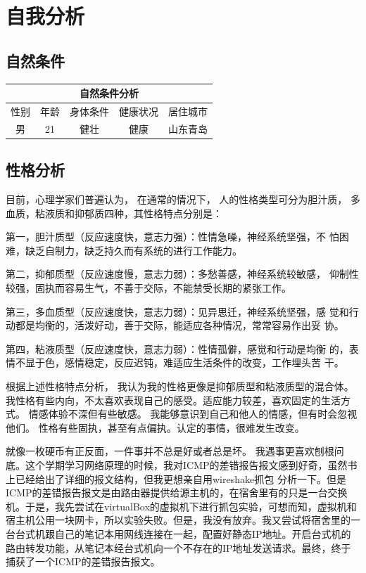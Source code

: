 \documentclass{article}
\begin{document}
\thispagestyle{empty}
\newpage
\setcounter{page}{1}
\section{自我分析}
\subsection{自然条件}
\begin{table}[h]
	\centering 
	\begin{tabular}{|c|c|c|c|c|}
		\hline
		\multicolumn{5}{|c|}{自然条件分析} \\
		\hline
		性别 & 年龄 & 身体条件 & 健康状况 & 居住城市 \\
		\cline{1-5} 
		男& 21 &健壮 & 健康& 山东青岛 \\
		\hline      
	\end{tabular}
\end{table}

\par
\subsection{性格分析}
目前，心理学家们普遍认为， 在通常的情况下， 人的性格类型可分为胆汁质，
多血质，粘液质和抑郁质四种，其性格特点分别是：\par
第一，胆汁质型（反应速度快，意志力强）：性情急噪，神经系统坚强，不
怕困难，缺乏自制力，缺乏持久而有系统的进行工作能力。\par
第二，抑郁质型（反应速度慢，意志力弱）：多愁善感，神经系统较敏感，
仰制性较强，固执而容易生气，不善于交际，不能禁受长期的紧张工作。\par
第三，多血质型（反应速度快，意志力弱）：见异思迁，神经系统坚强，感
觉和行动都是均衡的，活泼好动，善于交际，能适应各种情况，常常容易作出妥
协。\par
第四，粘液质型（反应速度快，意志力弱）：性情孤僻，感觉和行动是均衡
的，表情不显于色，感情稳定，反应迟钝，难适应生活条件的改变，工作埋头苦
干。\par
根据上述性格特点分析，
我认为我的性格更像是抑郁质型和粘液质型的混合体。
我性格有些内向，不太喜欢表现自己的感受。适应能力较差，喜欢固定的生活方式。
情感体验不深但有些敏感。
我能够意识到自己和他人的情感，但有时会忽视他们。
性格有些固执，甚至有点偏执。认定的事情，很难发生改变。
\par
就像一枚硬币有正反面，一件事并不总是好或者总是坏。
我遇事更喜欢刨根问底。这个学期学习网络原理的时候，我对ICMP的差错报告报文感到好奇，虽然书上已经给出了详细的报文结构，但我更想亲自用wireshake抓包
分析一下。但是ICMP的差错报告报文是由路由器提供给源主机的，在宿舍里有的只是一台交换机。于是，我先尝试在virtualBox的虚拟机下进行抓包实验，可想而知，虚拟机和宿主机公用一块网卡，所以实验失败。但是，我没有放弃。我又尝试将宿舍里的一台台式机跟自己的笔记本用网线连接在一起，配置好静态IP地址。开启台式机的路由转发功能，从笔记本经台式机向一个不存在的IP地址发送请求。最终，终于捕获了一个ICMP的差错报告报文。
\par
\newpage
\end{document}
